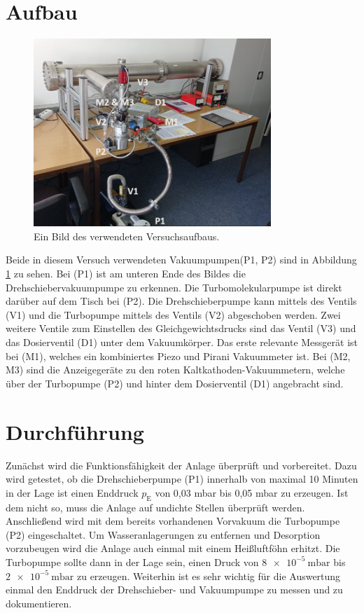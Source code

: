 \section{Aufbau}
		
	\begin{figure}
		\centering
		\includegraphics[width=0.8\textwidth]{"latex/images/Aufbau_beschriftet.png"}
		\caption{Ein Bild des verwendeten Versuchsaufbaus.}
		\label{fig:auf}
	\end{figure}		
	\noindent
	Beide in diesem Versuch verwendeten Vakuumpumpen(P1, P2) sind in Abbildung \ref{fig:auf} zu sehen.
	Bei (P1) ist am unteren Ende des Bildes die Drehschiebervakuumpumpe zu erkennen. 
	Die Turbomolekularpumpe ist direkt darüber auf dem Tisch bei (P2).
	Die Drehschieberpumpe kann mittels des Ventils (V1) und die Turbopumpe mittels des Ventils (V2) abgeschoben werden.
	Zwei weitere Ventile zum Einstellen des Gleichgewichtsdrucks sind das Ventil (V3) und das Dosierventil (D1) unter dem Vakuumkörper.
	Das erste relevante Messgerät ist bei (M1), welches ein kombiniertes Piezo und Pirani Vakuummeter ist.
	Bei (M2, M3) sind die Anzeigegeräte zu den roten Kaltkathoden-Vakuummetern, welche über der Turbopumpe (P2) und hinter dem Dosierventil (D1) angebracht sind.

\section{Durchführung}
	Zunächst wird die Funktionsfähigkeit der Anlage überprüft und vorbereitet. 
	Dazu wird getestet, ob die Drehschieberpumpe (P1) innerhalb von maximal 10 Minuten in der Lage ist einen Enddruck $p_\text{E}$ von 0,03 mbar bis 0,05 mbar zu erzeugen. 
	Ist dem nicht so, muss die Anlage auf undichte Stellen überprüft werden. 
	Anschließend wird mit dem bereits vorhandenen Vorvakuum die Turbopumpe (P2) eingeschaltet.
	Um Wasseranlagerungen zu entfernen und Desorption vorzubeugen wird die Anlage auch einmal mit einem Heißluftföhn erhitzt.
	Die Turbopumpe sollte dann in der Lage sein, einen Druck von $\SI{8 e-5}{\milli\bar}$ bis $\SI{2 e-5}{\milli\bar}$ zu erzeugen.
	Weiterhin ist es sehr wichtig für die Auswertung einmal den Enddruck der Drehschieber- und Vakuumpumpe zu messen und zu dokumentieren.	


